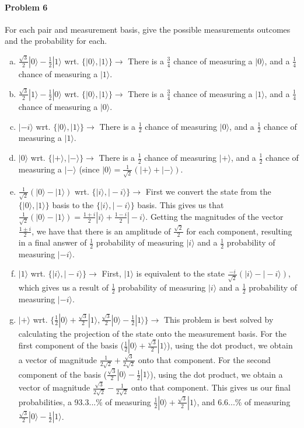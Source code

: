 \documentclass[12pt]{article}
\theoremstyle{mytheor}
\begin{document}
\paragraph{Problem 6} For each pair and measurement basis, give the possible measurements outcomes and the probability for each.
\begin{enumerate}[a)] %
\item $\frac{\sqrt{3}}{2}|0\rangle - \frac{1}{2}|1\rangle$ wrt. $\{|0\rangle,|1\rangle\} \rightarrow$ There is a $\frac{3}{4}$ chance of measuring a $|0\rangle$, and a $\frac{1}{4}$ chance of measuring a $|1\rangle$.
\item $\frac{\sqrt{3}}{2}|1\rangle - \frac{1}{2}|0\rangle$ wrt. $\{|0\rangle,|1\rangle\} \rightarrow$ There is a $\frac{3}{4}$ chance of measuring a $|1\rangle$, and a $\frac{1}{4}$ chance of measuring a $|0\rangle$.
\item $|-i\rangle$ wrt. $\{|0\rangle,|1\rangle\} \rightarrow$ There is a $\frac{1}{2}$ chance of measuring $|0\rangle$, and a $\frac{1}{2}$ chance of measuring a $|1\rangle$.
\item $|0\rangle$ wrt. $\{|+\rangle,|-\rangle\} \rightarrow$ There is a $\frac{1}{2}$ chance of measuring $|+\rangle$, and a $\frac{1}{2}$ chance of measuring a $|-\rangle$ (since $|0\rangle = \frac{1}{\sqrt{2}}(|+\rangle + |-\rangle)$.
\item $\frac{1}{\sqrt{2}}(|0\rangle - |1\rangle)$ wrt. $\{|i\rangle,|-i\rangle\} \rightarrow$ First we convert the state from the $\{|0\rangle,|1\rangle\}$ basis to the $\{|i\rangle,|-i\rangle\}$ basis. This gives us that $\frac{1}{\sqrt{2}}(|0\rangle - |1\rangle) = \frac{1+i}{2}|i\rangle + \frac{1-i}{2}|-i\rangle$. Getting the magnitudes of the vector $\frac{1 \pm i}{2}$, we have that there is an amplitude of $\frac{\sqrt{2}}{2}$ for each component, resulting in a final answer of $\frac{1}{2}$ probability of measuring $|i\rangle$ and a $\frac{1}{2}$ probability of measuring $|-i\rangle$.
\item $|1\rangle$ wrt. $\{|i\rangle,|-i\rangle\} \rightarrow$ First, $|1\rangle$ is equivalent to the state $\frac{-i}{\sqrt{2}}(|i\rangle - |-i\rangle)$, which gives us a result of $\frac{1}{2}$ probability of measuring $|i\rangle$ and a $\frac{1}{2}$ probability of measuring $|-i\rangle$.
\item $|+\rangle$ wrt. $\{\frac{1}{2}|0\rangle + \frac{\sqrt{3}}{2}|1\rangle,\frac{\sqrt{3}}{2}|0\rangle - \frac{1}{2}|1\rangle\} \rightarrow$ This problem is best solved by calculating the projection of the state onto the measurement basis. For the first component of the basis ($\frac{1}{2}|0\rangle + \frac{\sqrt{3}}{2}|1\rangle$), using the dot product, we obtain a vector of magnitude $\frac{1}{2\sqrt{2}} + \frac{\sqrt{3}}{2\sqrt{2}}$ onto that component. For the second component of the basis ($\frac{\sqrt{3}}{2}|0\rangle - \frac{1}{2}|1\rangle$), using the dot product, we obtain a vector of magnitude $\frac{\sqrt{3}}{2\sqrt{2}} - \frac{1}{2\sqrt{2}}$ onto that component. This gives us our final probabilities, a 93.3...\% of measuring $\frac{1}{2}|0\rangle + \frac{\sqrt{3}}{2}|1\rangle$, and 6.6...\% of measuring $\frac{\sqrt{3}}{2}|0\rangle - \frac{1}{2}|1\rangle$.
\end{enumerate}
\end{document}
